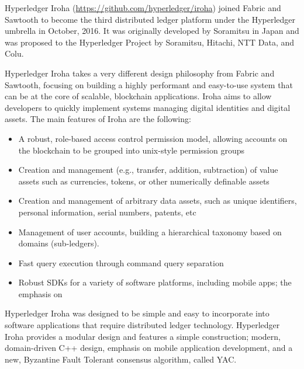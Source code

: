 Hyperledger Iroha (\url{https://github.com/hyperledger/iroha}) joined Fabric and Sawtooth to become the third distributed ledger platform under the Hyperledger umbrella in October, 2016. It was originally developed by Soramitsu in Japan and was proposed to the Hyperledger Project by Soramitsu, Hitachi, NTT Data, and Colu.

Hyperledger Iroha takes a very different design philosophy from Fabric and Sawtooth, focusing on building a highly performant and easy-to-use system that can be at the core of scalable, blockchain applications. Iroha aims to allow developers to quickly implement systems managing digital identities and digital assets. The main features of Iroha are the following:

\begin{itemize}
\item A robust, role-based access control permission model, allowing accounts on the blockchain to be grouped into unix-style permission groups
\item Creation and management (e.g., transfer, addition, subtraction) of value assets such as currencies, tokens, or other numerically definable assets
\item Creation and management of arbitrary data assets, such as unique identifiers, personal information, serial numbers, patents, etc
\item Management of user accounts, building a hierarchical taxonomy based on domains (sub-ledgers).
\item Fast query execution through command query separation
\item Robust SDKs for a variety of software platforms, including mobile apps; the emphasis on 
\end{itemize} 

Hyperledger Iroha was designed to be simple and easy to incorporate into software applications that require distributed ledger technology. Hyperledger Iroha provides a modular design and features a simple construction; modern, domain-driven C++ design, emphasis on mobile application development, and a new, Byzantine Fault Tolerant consensus algorithm, called YAC.

